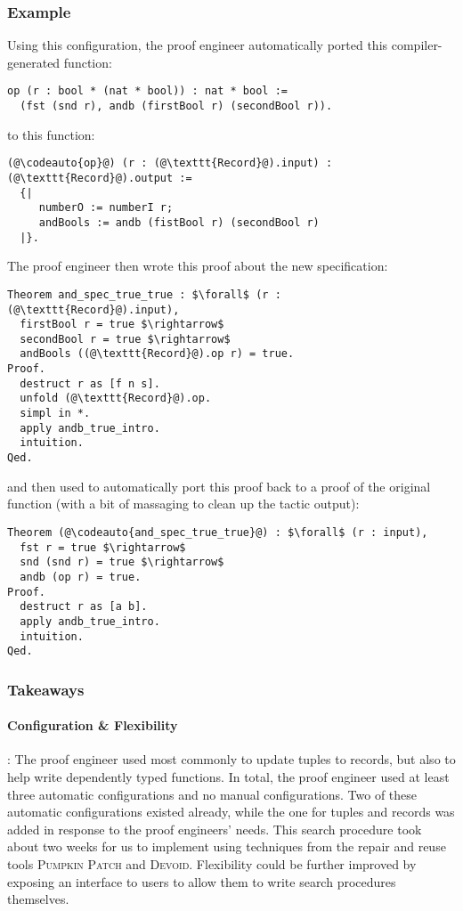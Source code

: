 \subsubsection{Example}
Using this configuration, the proof engineer automatically ported this compiler-generated function:

\begin{lstlisting}
op (r : bool * (nat * bool)) : nat * bool :=
  (fst (snd r), andb (firstBool r) (secondBool r)).
\end{lstlisting}
to this function:

\begin{lstlisting}
(@\codeauto{op}@) (r : (@\texttt{Record}@).input) : (@\texttt{Record}@).output :=
  {|
     numberO := numberI r;
     andBools := andb (fistBool r) (secondBool r)
  |}.
\end{lstlisting}
The proof engineer then wrote this proof about the new specification: %

\begin{lstlisting}
Theorem and_spec_true_true : $\forall$ (r : (@\texttt{Record}@).input),
  firstBool r = true $\rightarrow$
  secondBool r = true $\rightarrow$
  andBools ((@\texttt{Record}@).op r) = true.
Proof.
  destruct r as [f n s].
  unfold (@\texttt{Record}@).op.
  simpl in *.
  apply andb_true_intro.
  intuition.
Qed.
\end{lstlisting}
and then used \toolname to automatically port this proof back to a proof of the original function
(with a bit of massaging to clean up the tactic output): %

\begin{lstlisting}
Theorem (@\codeauto{and_spec_true_true}@) : $\forall$ (r : input),
  fst r = true $\rightarrow$
  snd (snd r) = true $\rightarrow$
  andb (op r) = true.
Proof.
  destruct r as [a b].
  apply andb_true_intro.
  intuition.
Qed.
\end{lstlisting}

\subsubsection{Takeaways}

\paragraph{Configuration \& Flexibility}:
The proof engineer used \toolname most commonly to update tuples to records,
but also to help write dependently typed functions.
In total, the proof engineer used at least three automatic configurations and no manual configurations.
Two of these automatic configurations existed already, while the one for tuples and records was
added in response to the proof engineers' needs.
This search procedure took about two weeks for us to implement using techniques from
the repair and reuse tools \textsc{Pumpkin Patch} and \textsc{Devoid}.
Flexibility could be further improved by exposing an interface to users to allow them to
write search procedures themselves.

